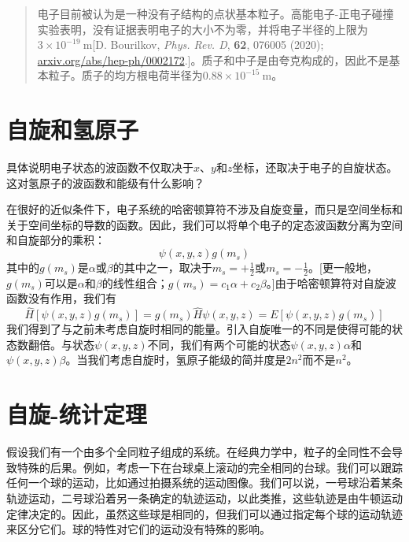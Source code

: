     \begin{quote}
        \small
        \noindent
        电子目前被认为是一种没有子结构的点状基本粒子。高能电子-正电子碰撞实验表明，没有证据表明电子的大小不为零，并将电子半径的上限为$3 \times 10^{-19} \:\mathrm{m}$[D. Bourilkov, \textit{Phys. Rev. D}, \textbf{62}, 076005 (2020); \url{arxiv.org/abs/hep-ph/0002172}.]。质子和中子是由夸克构成的，因此不是基本粒子。质子的均方根电荷半径为$0.88 \times 10^{-15} \:\mathrm{m}$。
    \end{quote}

\section{自旋和氢原子}
\label{sec:10.2 Spin and the Hydrogen Atom}

    具体说明电子状态的波函数不仅取决于$x$、$y$和$z$坐标，还取决于电子的自旋状态。这对氢原子的波函数和能级有什么影响？

    在很好的近似条件下，电子系统的哈密顿算符不涉及自旋变量，而只是空间坐标和关于空间坐标的导数的函数。因此，我们可以将单个电子的定态波函数分离为空间和自旋部分的乘积：
    \begin{equation*}
        \psi\left(x,y,z\right)g\left(m_s\right)
    \end{equation*}
    其中的$g\left(m_s\right)$是$\alpha$或$\beta$的其中之一，取决于$m_s = +\frac{1}{2}$或$m_s = -\frac{1}{2}$。[更一般地，$g\left(m_s\right)$可以是$\alpha$和$\beta$的线性组合；$g\left(m_s\right) = c_1 \alpha + c_2\beta$。]由于哈密顿算符对自旋波函数没有作用，我们有
    \begin{equation*}
        \hat{H} \left[\psi\left(x, y, z\right) g\left(m_s\right)\right] = g\left(m_s\right) \hat{H} \psi\left(x, y, z\right) = E \left[\psi\left(x, y, z\right) g\left(m_s\right)\right]
    \end{equation*}
    我们得到了与之前未考虑自旋时相同的能量。引入自旋唯一的不同是使得可能的状态数翻倍。与状态$\psi\left(x, y, z\right)$不同，我们有两个可能的状态$\psi\left(x, y, z\right) \alpha$和$\psi\left(x, y, z\right) \beta$。当我们考虑自旋时，氢原子能级的简并度是$2n^2$而不是$n^2$。

\section{自旋-统计定理}
\label{sec:10.3 Spin-Statistics Theorem}

    假设我们有一个由多个全同粒子组成的系统。在经典力学中，粒子的全同性不会导致特殊的后果。例如，考虑一下在台球桌上滚动的完全相同的台球。我们可以跟踪任何一个球的运动，比如通过拍摄系统的运动图像。我们可以说，一号球沿着某条轨迹运动，二号球沿着另一条确定的轨迹运动，以此类推，这些轨迹是由牛顿运动定律决定的。因此，虽然这些球是相同的，但我们可以通过指定每个球的运动轨迹来区分它们。球的特性对它们的运动没有特殊的影响。

